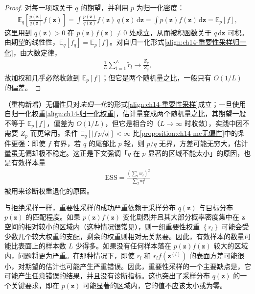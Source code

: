 \documentclass[../../main.tex]{subfiles}
\begin{document}
\begin{proof}
对每一项取关于 $q$ 的期望，并利用 $p$ 为归一化密度：
\begin{align*}
\mathbb{E}_{q}\left[\frac{p(\bm{z})}{q(\bm{z})}f(\bm{z})\right]=\int\frac{p(\bm{z})}{q(\bm{z})}f(\bm{z})\,q(\bm{z})\,\mathrm{d}\bm{z}=\int p(\bm{z})f(\bm{z})\,\mathrm{d}\bm{z}=\mathbb{E}_{p}[f],
\end{align*}
这里用到 $q(\bm{z})>0$ 在 $p(\bm{z})f(\bm{z})\neq0$ 处成立，从而被积函数关于 $q\,\mathrm{d}\bm{z}$ 可积。由期望的线性性，$\mathbb{E}_{q}\left[\overline{f}_{q}\right]=\mathbb{E}_{p}[f]$。对自归一化形式\eqref{align:ch14-重要性采样归一化}，由大数定律，
\begin{align*}
\frac{1}{L}\sum_{l=1}^{L}\tilde{r}_{l}\longrightarrow\frac{Z_{p}}{Z_{q}},
\end{align*}
故加权和几乎必然收敛到 $\mathbb{E}_{p}[f]$；但它是两个随机量之比，一般只有 $O(1/L)$ 的偏差。
\end{proof}

\begin{remark}（重构新增）无偏性只对\emph{未归一化}的形式\eqref{align:ch14-重要性采样}成立；一旦使用自归一化权重\eqref{align:ch14-归一化权重}，估计量变成两个随机量之比，其期望一般不等于 $\mathbb{E}_{p}[f]$，偏差为 $O(1/L)$，但它是相合的（$L\to\infty$ 时收敛），实践中因不需要 $Z_{p}$ 而更常用。条件 $\mathbb{E}_{q}\left[\left|f\,p/q\right|\right]<\infty$ 比\cref{proposition:ch14-mc无偏性}中的条件更强：即使 $f$ 有界，若 $q$ 的尾部比 $p$ 轻，则 $p/q$ 无界，方差可能无穷大，估计量虽无偏却极不稳定。这正是下文强调「$q$ 在 $p$ 显著的区域不能太小」的原因，也是有效样本量
\begin{align*}
\mathrm{ESS}=\frac{\left(\sum_{l}w_{l}\right)^{2}}{\sum_{l}w_{l}^{2}}
\end{align*}
被用来诊断权重退化的原因。
\end{remark}

与拒绝采样一样，重要性采样的成功严重依赖于采样分布 $q(\bm{z})$ 与目标分布 $p(\bm{z})$ 的匹配程度。如果 $p(\bm{z})f(\bm{z})$ 变化剧烈并且其大部分概率密度集中在 $\bm{z}$ 空间的相对较小的区域内（这种情况很常见），则一组重要性权重 $\left\{r_{l}\right\}$ 可能会受少数几个较大权重的支配，剩余的权重则相对无关紧要。因此，有效样本的数量可能比表面上的样本数 $L$ 少得多。如果没有任何样本落在 $p(\bm{z})f(\bm{z})$ 较大的区域内，问题将更为严重。在那种情况下，即使 $r_{l}$ 和 $r_{l}f\!\left(\bm{z}^{(l)}\right)$ 的表面方差可能很小，对期望的估计也可能产生严重错误。因此，重要性采样的一个主要缺点是，它可能产生任意错误的结果，并且没有诊断指标。这也突出了采样分布 $q(\bm{z})$ 的一个关键要求，即在 $p(\bm{z})$ 可能显著的区域内，它的值不应该太小或为零。
\end{document}
